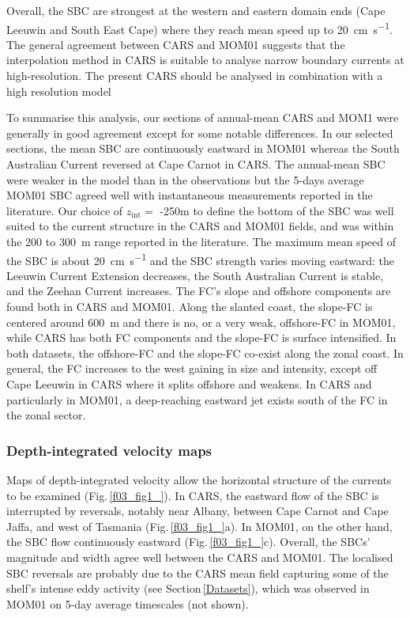 \documentclass[preprint,3p,review,12pt]{elsarticle}
\newcommand{\sub}[1]{_{\text{#1}}}
\begin{document}
Overall, the SBC are strongest at the western and eastern domain ends (Cape Leeuwin and South East Cape) where they reach mean speed up to \SI{20}{\centi\meter\per\second}. The general agreement between CARS and MOM01 suggests that the interpolation method in CARS is suitable to analyse narrow boundary currents at high-resolution. The present CARS should be analysed in combination with a high resolution model


To summarise this analysis, our sections of annual-mean CARS and MOM1 were generally in good agreement except for some notable differences. In our selected sections, the mean SBC are continuously eastward in MOM01 whereas the South Australian Current reversed at Cape Carnot in CARS. The annual-mean SBC were weaker in the model than in the observations but the 5-days average MOM01 SBC agreed well with instantaneous measurements reported in the literature. Our choice of $z\sub{int} =$ -250\si{\meter} to define the bottom of the SBC was well suited to the current structure in the CARS and MOM01 fields, and was within the \num{200} to \SI{300}{\meter} range reported in the literature.
The maximum mean speed of the SBC is about
\SI{20}{\centi\meter\per\second} and
the SBC strength varies moving eastward: the Leeuwin Current Extension decreases, the South Australian Current is stable, and the Zeehan Current increases.
The FC's slope and offshore components are
found both in CARS and MOM01. Along the slanted coast, the slope-FC is centered around \SI{600}{\meter} and there is no, or a very weak, offshore-FC in MOM01, while CARS has both FC components and the slope-FC is surface intensified. In both datasets, the offshore-FC and the slope-FC co-exist along the zonal coast. In general, the FC increases to the west gaining in size and intensity, except off Cape Leeuwin in CARS where it splits offshore and weakens. In CARS and particularly in MOM01, a deep-reaching eastward jet exists south of the FC in the zonal sector.


\subsubsection{Depth-integrated velocity maps}\label{Depth-integrated velocity maps}
Maps of depth-integrated velocity allow the horizontal structure of the currents to be examined (Fig.\,\ref{f03_fig1_}). In CARS, the eastward flow of the SBC is interrupted by reversals, notably near Albany, between Cape Carnot and Cape Jaffa, and west of Tasmania (Fig.\,\ref{f03_fig1_}a). In MOM01, on the other hand, the SBC flow continuously eastward (Fig.\,\ref{f03_fig1_}c). Overall, the SBCs' magnitude and width agree well between the CARS and MOM01.
The localised SBC reversals are probably due to the CARS mean field capturing some of the shelf's intense eddy activity (see Section\,\ref{Datasets}), which was observed in MOM01 on 5-day average timescales (not shown).
\end{document}
